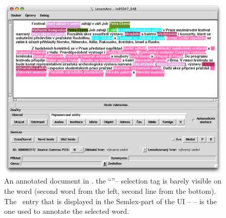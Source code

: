\begin{figure}[htbp]
   \centering
   \includegraphics[scale=.4]{images/sem-ann.png} 
   \caption{An annotated document in \seman. the ``''-- selection tag is barely visible on the word  (second word from the left, second line from the bottom). The \semlex\ entry that is displayed in the Semlex-part of the UI --  -- is the one used to annotate the selected word. }
   \label{fig:example}
\end{figure}